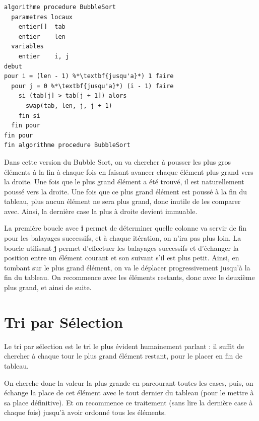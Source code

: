 \documentclass[11pt,a4paper]{article}
\begin{document}
\begin{table}[ht!]
  \centering
\begin{lstlisting}[style=algorithmique]
algorithme procedure BubbleSort
  parametres locaux
    entier[]  tab
    entier    len
  variables
    entier    i, j
debut
pour i = (len - 1) %*\textbf{jusqu'a}*) 1 faire
  pour j = 0 %*\textbf{jusqu'a}*) (i - 1) faire
    si (tab[j] > tab[j + 1]) alors
      swap(tab, len, j, j + 1)
    fin si
  fin pour
fin pour
fin algorithme procedure BubbleSort \end{lstlisting}
\end{table}


Dans cette version du Bubble Sort, on va chercher à pousser les plus gros éléments à la fin à chaque fois en faisant avancer chaque élément plus grand vers la droite.
Une fois que le plus grand élément a été trouvé, il est naturellement poussé vers la droite.
Une fois que ce plus grand élément est poussé à la fin du tableau, plus aucun élément ne sera plus grand, donc inutile de les comparer avec.
Ainsi, la dernière case la plus à droite devient immuable.

\medskip

La première boucle avec \textbf{i} permet de déterminer quelle colonne va servir de fin pour les balayages successifs, et à chaque itération, on n'ira pas plus loin.
La boucle utilisant \textbf{j} permet d'effectuer les balayages successifs et d'échanger la position entre un élément courant et son suivant s'il est plus petit.
Ainsi, en tombant sur le plus grand élément, on va le déplacer progressivement jusqu'à la fin du tableau.
On recommence avec les éléments restants, donc avec le deuxième plus grand, et ainsi de suite.

\vfillFirst
\vfillLast


\section{Tri par Sélection}

\medskip

Le tri par sélection est le tri le plus évident humainement parlant : il suffit de chercher à chaque tour le plus grand élément restant, pour le placer en fin de tableau.

\medskip

On cherche donc la valeur la plus grande en parcourant toutes les cases, puis, on échange la place de cet élément avec le tout dernier du tableau (pour le mettre à sa place définitive).
Et on recommence ce traitement (sans lire la dernière case à chaque fois) jusqu'à avoir ordonné tous les éléments.
\end{document}
